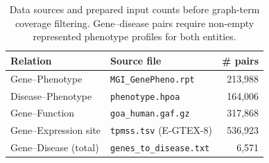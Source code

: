 \begin{table}[htbp]
  \centering
  \caption{Data sources and prepared input counts before graph-term coverage filtering.
    Gene--disease pairs require non-empty represented phenotype profiles for both entities.}
  \label{tab:datasets}
  \small
  \begin{tabular}{llr}
    \toprule
    Relation & Source file & \# pairs \\
    \midrule
    Gene--Phenotype          & \texttt{MGI\_GenePheno.rpt}    & 213{,}988 \\
    Disease--Phenotype       & \texttt{phenotype.hpoa}        & 164{,}006 \\
    Gene--Function           & \texttt{goa\_human.gaf.gz}     & 317{,}868 \\
    Gene--Expression site    & \texttt{tpmss.tsv} (E-GTEX-8)  & 536{,}923 \\
    Gene--Disease (total)    & \texttt{genes\_to\_disease.txt} & 6{,}571 \\
    \bottomrule
  \end{tabular}
\end{table}
